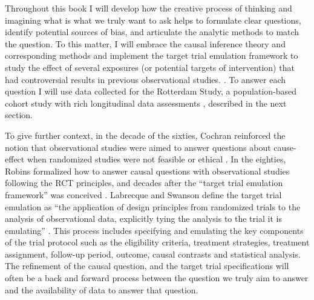 \documentclass[
]{book}
\begin{document}
Throughout this book I will develop how the creative process of thinking and imagining what is what we truly want to ask helps to formulate clear questions, identify potential sources of bias, and articulate the analytic methods to match the question. To this matter, I will embrace the causal inference theory and corresponding methods and implement the target trial emulation framework to study the effect of several exposures (or potential targets of intervention) that had controversial results in previous observational studies. \autocite{hernan_robins_2016,labrecque2018}. To answer each question I will use data collected for the Rotterdam Study, a population-based cohort study with rich longitudinal data assessments \autocite{ikram2020}, described in the next section.

To give further context, in the decade of the sixties, Cochran reinforced the notion that observational studies were aimed to answer questions about cause-effect when randomized studies were not feasible or ethical \autocite{cochran1965}. In the eighties, Robins formalized how to answer causal questions with observational studies following the RCT principles, and decades after the ``target trial emulation framework'' was conceived \autocite{hernan_robins_2016}. Labrecque and Swanson define the target trial emulation as ``the application of design principles from randomized trials to the analysis of observational data, explicitly tying the analysis to the trial it is emulating'' \autocite{labrecque2018}. This process includes specifying and emulating the key components of the trial protocol such as the eligibility criteria, treatment strategies, treatment assignment, follow-up period, outcome, causal contrasts and statistical analysis. The refinement of the causal question, and the target trial specifications will often be a back and forward process between the question we truly aim to answer and the availability of data to answer that question\autocite{labrecque2018,whatif2020}.
\end{document}
